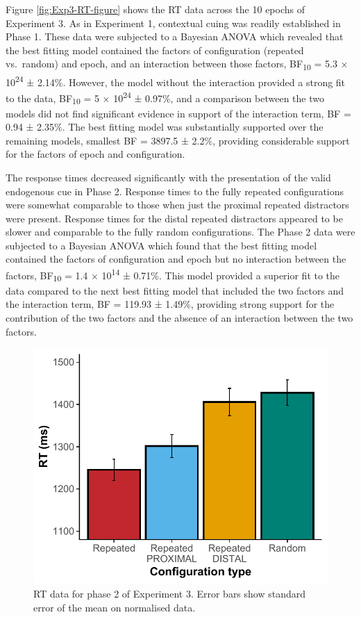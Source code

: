 \documentclass[
  man,floatsintext]{apa7}
\begin{document}
Figure \ref{fig:Exp3-RT-figure} shows the RT data across the 10 epochs of Experiment 3. As in Experiment 1, contextual cuing was readily established in Phase 1. These data were subjected to a Bayesian ANOVA which revealed that the best fitting model contained the factors of configuration (repeated vs.~random) and epoch, and an interaction between those factors, BF\textsubscript{10} = 5.3 × 10\textsuperscript{24} ± 2.14\%. However, the model without the interaction provided a strong fit to the data, BF\textsubscript{10} = 5 × 10\textsuperscript{24} ± 0.97\%, and a comparison between the two models did not find significant evidence in support of the interaction term, BF = 0.94 ± 2.35\%. The best fitting model was substantially supported over the remaining models, smallest BF = 3897.5 ± 2.2\%, providing considerable support for the factors of epoch and configuration.

The response times decreased significantly with the presentation of the valid endogenous cue in Phase 2. Response times to the fully repeated configurations were somewhat comparable to those when just the proximal repeated distractors were present. Response times for the distal repeated distractors appeared to be slower and comparable to the fully random configurations. The Phase 2 data were subjected to a Bayesian ANOVA which found that the best fitting model contained the factors of configuration and epoch but no interaction between the factors, BF\textsubscript{10} = 1.4 × 10\textsuperscript{14} ± 0.71\%. This model provided a superior fit to the data compared to the next best fitting model that included the two factors and the interaction term, BF = 119.93 ± 1.49\%, providing strong support for the contribution of the two factors and the absence of an interaction between the two factors.

\begin{figure}

{\centering \includegraphics{CCC_ms1_files/figure-latex/Exp3-Phase-2-figure-1} 

}

\caption{RT data for phase 2 of Experiment 3. Error bars show standard error of the mean on normalised data.}\label{fig:Exp3-Phase-2-figure}
\end{figure}
\end{document}
